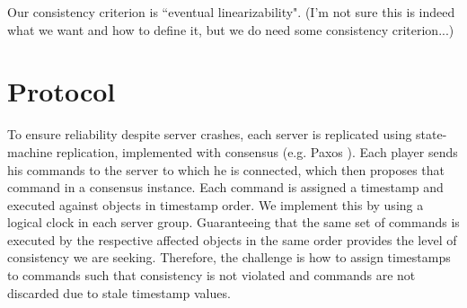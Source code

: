 \documentclass[times, 10pt]{article}
\begin{document}

Our consistency criterion is ``eventual linearizability". (I'm not sure this is indeed what we want and how to define it, but we do need some consistency criterion...)


% 
%
%



\section{Protocol}

To ensure reliability despite server crashes, each server is replicated using state-machine replication, implemented with consensus (e.g. Paxos \cite{lamport1998ptp}). Each player sends his commands to the server to which he is connected, which then proposes that command in a consensus instance. Each command is assigned a timestamp and executed against objects in timestamp order. We implement this by using a logical clock in each server group. Guaranteeing that the same set of commands is executed by the respective affected objects in the same order provides the level of consistency we are seeking. Therefore, the challenge is how to assign timestamps to commands such that consistency is not violated and commands are not discarded due to stale timestamp values.
\end{document}
